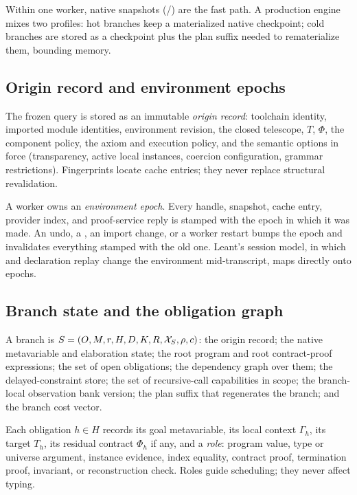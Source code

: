 Within one worker, native snapshots (/) are the fast path. A production engine mixes two profiles: hot branches keep a materialized native checkpoint; cold branches are stored as a checkpoint plus the plan suffix needed to rematerialize them, bounding memory.

\subsection{Origin record and environment epochs}

The frozen query is stored as an immutable \emph{origin record}: toolchain identity, imported module identities, environment revision, the closed telescope, $T$, $\Phi$, the component policy, the axiom and execution policy, and the semantic options in force (transparency, active local instances, coercion configuration, grammar restrictions). Fingerprints locate cache entries; they never replace structural revalidation.

A worker owns an \emph{environment epoch}. Every handle, snapshot, cache entry, provider index, and proof-service reply is stamped with the epoch in which it was made. An undo, a , an import change, or a worker restart bumps the epoch and invalidates everything stamped with the old one. Leant's session model, in which  and declaration replay change the environment mid-transcript, maps directly onto epochs.

\subsection{Branch state and the obligation graph}\label{sec:obligation-graph}

\begin{definition}\label{def:branch}
A branch is $S = (O, M, r, H, D, K, R, \mathcal{X}_S, \rho, c)$: the origin record; the native metavariable and elaboration state; the root program and root contract-proof expressions; the set of open obligations; the dependency graph over them; the delayed-constraint store; the set of recursive-call capabilities in scope; the branch-local observation bank version; the plan suffix that regenerates the branch; and the branch cost vector.
\end{definition}

Each obligation $h \in H$ records its goal metavariable, its local context $\Gamma_h$, its target $T_h$, its residual contract $\Phi_h$ if any, and a \emph{role}: program value, type or universe argument, instance evidence, index equality, contract proof, termination proof, invariant, or reconstruction check. Roles guide scheduling; they never affect typing.

